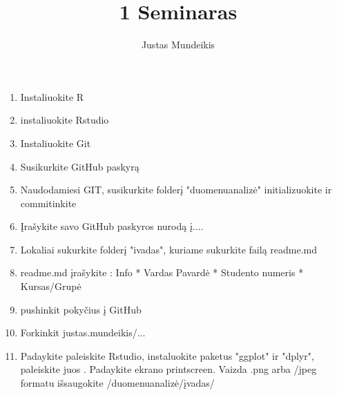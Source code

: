 \documentclass[12pt,a4paper]{article}
\author{Justas Mundeikis}
\title{1 Seminaras}
\begin{document}
\begin{enumerate}
\item Instaliuokite R
\item instaliuokite Rstudio
\item Instaliuokite Git
\item Susikurkite GitHub paskyrą
\item Naudodamiesi GIT, susikurkite folderį "duomenuanalizė" initializuokite ir commitinkite
\item Įrašykite savo GitHub paskyros nurodą į....
\item Lokaliai sukurkite folderį "ivadas", kuriame sukurkite failą readme.md
\item readme.md įrašykite :
Info
* Vardas Pavardė
* Studento numeris
* Kursas/Grupė
\item pushinkit pokyčius į GitHub
\item Forkinkit justas.mundeikis/...
\item Padaykite paleiskite Rstudio, instaluokite paketus "ggplot" ir "dplyr", paleiskite juos . Padaykite ekrano printscreen. Vaizda .png arba /jpeg formatu išsaugokite /duomenuanalizė/įvadas/
\end{enumerate}
\end{document}
